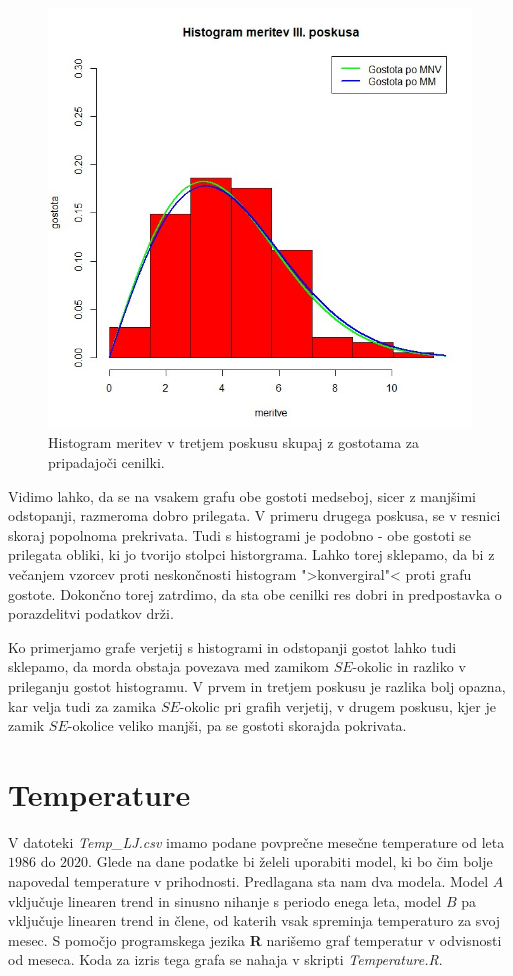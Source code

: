 \documentclass[a4paper, 10pt]{article}
\begin{document}
	\begin{figure}[h!]
		\label{fig: 2FHist3}
		\centering
		\includegraphics[scale=0.5]{Hist3}
		\caption{Histogram meritev v tretjem poskusu skupaj z gostotama za pripadajoči cenilki.}
	\end{figure}
	
	Vidimo lahko, da se na vsakem grafu obe gostoti medseboj, sicer z manjšimi odstopanji, razmeroma dobro prilegata. V primeru drugega poskusa, se v resnici skoraj popolnoma prekrivata. Tudi s histogrami je podobno - obe gostoti se prilegata obliki, ki jo tvorijo stolpci historgrama. Lahko torej sklepamo, da bi z večanjem vzorcev proti neskončnosti histogram ">konvergiral"< proti grafu gostote. Dokončno torej zatrdimo, da sta obe cenilki res dobri in predpostavka o porazdelitvi podatkov drži. 
	
	Ko primerjamo grafe verjetij s histogrami in odstopanji gostot lahko tudi sklepamo, da morda obstaja povezava med zamikom $SE$-okolic in razliko v prileganju gostot histogramu. V prvem in tretjem poskusu je razlika bolj opazna, kar velja tudi za zamika $SE$-okolic pri grafih verjetij, v drugem poskusu, kjer je zamik $SE$-okolice veliko manjši, pa se gostoti skorajda pokrivata.
	
	\section{Temperature}\label{sect: Temperature}
	V datoteki \textit{Temp\_LJ.csv} imamo podane povprečne mesečne temperature od leta $1986$ do $2020$. Glede na dane podatke bi želeli uporabiti model, ki bo čim bolje napovedal temperature v prihodnosti. 
	Predlagana sta nam dva modela. Model $A$ vključuje linearen trend in sinusno nihanje s periodo enega leta, model $B$ pa vključuje linearen trend in člene, od katerih vsak spreminja temperaturo za svoj mesec. S pomočjo programskega jezika \textbf{R} narišemo graf temperatur v odvisnosti od meseca. Koda za izris tega grafa se nahaja v skripti \textit{Temperature.R}.
	
\end{document}
